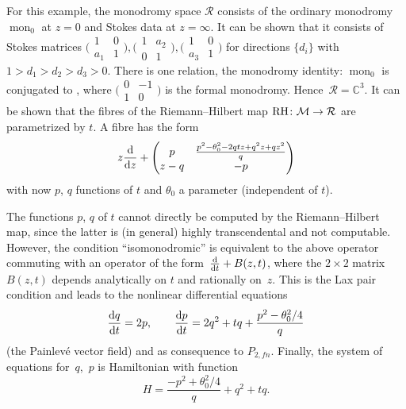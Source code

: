 \documentclass[pdftex]{sigma}
\numberwithin{equation}{section}
\begin{document}
 For this example, the monodromy space $\mathcal{R}$ consists of the ordinary monodromy $\operatorname{mon}_0$ at $z=0$ and Stokes
data at $z=\infty$. It can be shown that it consists of Stokes matrices
$\bigl(\begin{smallmatrix} 1 & 0\\a_1 &1\end{smallmatrix}\bigr), \bigl(\begin{smallmatrix} 1 & a_2\\0 &1\end{smallmatrix}\bigr), \bigl(\begin{smallmatrix} 1 & 0\\a_3 &1\end{smallmatrix}\bigr)$ for directions $\{d_i\}$ with $1>d_1>d_2>d_3>0$.
There is one relation, the monodromy identity:
$\operatorname{mon}_0$ is conjugated to
,
where $\bigl(\begin{smallmatrix} 0 & -1\\1 &0\end{smallmatrix}\bigr)$ is the formal monodromy. Hence~${\mathcal{R}=\mathbb{C}^3}$.
It can be shown that the fibres of the Riemann--Hilbert map ${\rm RH}\colon\mathcal{M}\rightarrow \mathcal{R}$ are parametrized
by $t$. A fibre has the form
\[
z\frac{{\rm d}}{{\rm d}z}+ \left(\begin{matrix} p & \frac{p^2-\theta_0^2-2qtz+q^2z+qz^2}{q}\\ z-q & -p \end{matrix}\right)
\]
with now $p$, $q$ functions of $t$ and $\theta_0$ a parameter (independent of $t$).

The functions $p$, $q$ of $t$ cannot directly be computed by the Riemann--Hilbert map, since the latter
 is (in general) highly transcendental and not computable. However, the condition ``isomonodromic'' is equivalent to
the above operator commuting with an operator of the form~${\frac{{\rm d}}{{\rm d}t}+B(z,t)}$, where the $2\times 2$ matrix
$B(z,t)$ depends analytically on $t$ and rationally on~$z$. This is the Lax pair condition and leads to the nonlinear
differential equations
\[
\frac{{\rm d}q}{{\rm d}t}=2p , \qquad \frac{{\rm d}p}{{\rm d}t}=2q^2+tq+\frac{p^2-\theta_0^2/4}{q}
\]
 (the Painlev\'e vector field)
and as consequence to $P_{2,fn}$. Finally, the system of equations for~$q$,~$p$ is Hamiltonian with function
\[
H=\frac{-p^2+\theta_0^2/4}{q}+q^2+tq.
\]
\end{document}
